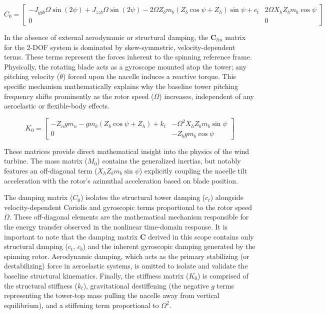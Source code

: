 \documentclass[final,onecolumn]{IEEEtran}
\begin{document}
\begin{equation}
    \label{eq:linear_C0}
    C_0 = \begin{bmatrix}
        - J_{yy b} \Omega \sin{(2 \psi)} + J_{zz b} \Omega \sin{(2 \psi)} - 2 \Omega Z_{b} m_{b} \left(Z_{b} \cos{\psi} + Z_{h}\right) \sin{\psi} + c_{t} & 2 \Omega X_{h} Z_{b} m_{b} \cos{\psi} \\
        0                                                                                                                                                 & 0
    \end{bmatrix}
\end{equation}

In the absence of external aerodynamic or structural damping, the $\boldsymbol{C}_{lin}$ matrix for the 2-DOF system is dominated by skew-symmetric, velocity-dependent terms. These terms represent the forces inherent to the spinning reference frame. Physically, the rotating blade acts as a gyroscope mounted atop the tower; any pitching velocity ($\dot{\theta}$) forced upon the nacelle induces a reactive torque. This specific mechanism mathematically explains why the baseline tower pitching frequency shifts prominently as the rotor speed ($\Omega$) increases, independent of any aeroelastic or flexible-body effects.

\begin{equation}
    \label{eq:linear_K0}
    K_0 = \begin{bmatrix}
        - Z_{n} g m_{n} - g m_{b} \left(Z_{b} \cos{\psi} + Z_{h}\right) + k_{t} & - \Omega^{2} X_{h} Z_{b} m_{b} \sin{\psi} \\
        0                                                                       & - Z_{b} g m_{b} \cos{\psi}
    \end{bmatrix}
\end{equation}

These matrices provide direct mathematical insight into the physics of the wind turbine. The mass matrix ($M_0$) contains the generalized inertias, but notably features an off-diagonal term ($X_h Z_b m_b \sin\psi$) explicitly coupling the nacelle tilt acceleration with the rotor's azimuthal acceleration based on blade position.

The damping matrix ($C_0$) isolates the structural tower damping ($c_t$) alongside velocity-dependent Coriolis and gyroscopic terms proportional to the rotor speed $\Omega$. These off-diagonal elements are the mathematical mechanism responsible for the energy transfer observed in the nonlinear time-domain response. It is important to note that the damping matrix $\boldsymbol{C}$ derived in this scope contains only structural damping ($c_t$, $c_b$) and the inherent gyroscopic damping generated by the spinning rotor. Aerodynamic damping, which acts as the primary stabilizing (or destabilizing) force in aeroelastic systems, is omitted to isolate and validate the baseline structural kinematics. Finally, the stiffness matrix ($K_0$) is comprised of the structural stiffness ($k_t$), gravitational destiffening (the negative $g$ terms representing the tower-top mass pulling the nacelle away from vertical equilibrium), and a stiffening term proportional to $\Omega^2$.
\end{document}

